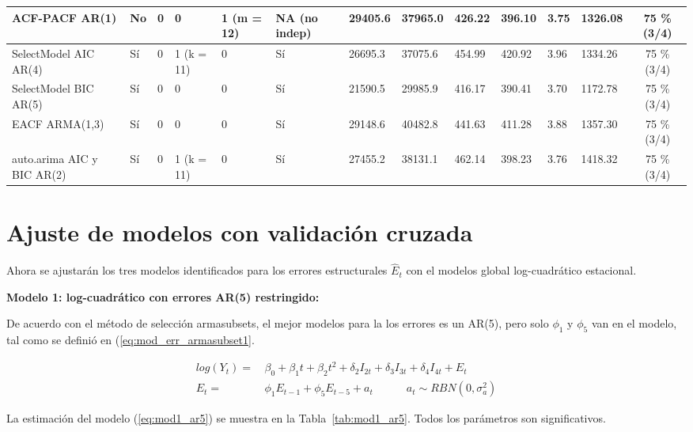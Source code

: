 \documentclass[11pt, letterpaper, twoside]{article}
\begin{document}
\begin{sidewaystable}
{\begin{tabular}{|p{1.8cm}|p{1.8cm}|p{1.8cm}|p{1.8cm}|p{1.7cm}|p{1.7cm}|p{0.9cm}|p{0.9cm}|p{0.8cm}|p{0.8cm}|p{0.9cm}|p{1.3cm}|c|}
 \hline
 ACF-PACF \newline AR(1) & No & 0 & 0 & 1 (m = 12) & NA \newline (no indep) & 29405.6 & 37965.0 & 426.22 & 396.10 & 3.75 & 1326.08 & 75 \% (3/4) \\
 \hline
 SelectModel AIC \newline AR(4) & Sí & 0 & 1 (k = 11) & 0 & Sí & 26695.3 & 37075.6 & 454.99 & 420.92 & 3.96 & 1334.26 & 75 \% (3/4) \\
 \hline
 SelectModel BIC \newline AR(5) & Sí & 0 & 0 & 0 & Sí & 21590.5 & 29985.9 & 416.17 & 390.41 & 3.70 & 1172.78 & 75 \% (3/4) \\
 \hline
 EACF \newline ARMA(1,3) & Sí & 0 & 0 & 0 & Sí & 29148.6 & 40482.8 & 441.63 & 411.28 & 3.88 & 1357.30 & 75 \% (3/4) \\
 \hline
 auto.arima AIC y BIC \newline AR(2) & Sí & 0 & 1 (k = 11) & 0 & Sí & 27455.2 & 38131.1 & 462.14 & 398.23 & 3.76 & 1418.32 & 75 \% (3/4) \\
 \hline
\end{tabular}
}
\end{sidewaystable}


\section{Ajuste de modelos con validación cruzada}

Ahora se ajustarán los tres modelos identificados para los errores estructurales $\hat{E}_t$ con el modelos global log-cuadrático estacional.

\textbf{Modelo 1: log-cuadrático con errores AR(5) restringido:}

De acuerdo con el método de selección armasubsets, el mejor modelos para la los errores es un AR(5), pero solo $\phi_1$ y $\phi_5$ van en el modelo, tal como se definió en (\ref{eq:mod_err_armasubset1}.

\begin{align}
\label{eq:mod1_ar5}
    log(Y_t) = & \, \beta_0 + \beta_1 t + \beta_2 t^2 + \delta_2 I_{2t} + \delta_3 I_{3t} + \delta_4 I_{4t} + E_t \\
    E_t = & \, \phi_1 E_{t-1} + \phi_5 E_{t-5} + a_t \quad \qquad a_t \sim RBN(0,\sigma_a^2) \nonumber
\end{align}

La estimación del modelo (\ref{eq:mod1_ar5}) se muestra en la Tabla~\ref{tab:mod1_ar5}. Todos los parámetros son significativos.
\end{document}
